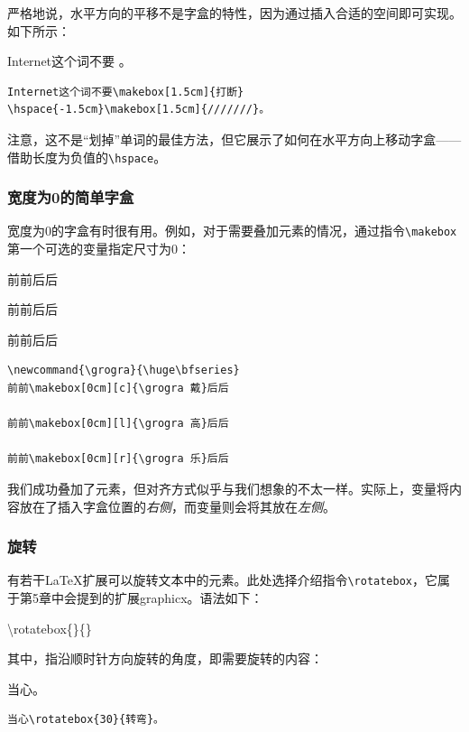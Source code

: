严格地说，水平方向的平移不是字盒的特性，因为通过插入合适的空间即可实现。如下所示：

\begin{codelist}[4.13]{
  Internet这个词不要
\hspace{-1.5cm}\makebox[1.5cm]{///////}。
}\begin{verbatim}
Internet这个词不要\makebox[1.5cm]{打断}
\hspace{-1.5cm}\makebox[1.5cm]{///////}。
\end{verbatim}
\end{codelist}

注意，这不是“划掉”单词的最佳方法，但它展示了如何在水平方向上移动字盒——借助长度为负值的\verb|\hspace|。

\subsubsection{宽度为0的简单字盒}

宽度为0的字盒有时很有用。例如，对于需要叠加元素的情况，通过指令\verb|\makebox|第一个可选的变量指定尺寸为0：

\begin{codelist}[4.14]{
  \newcommand{\grogra}{\huge\bfseries}
前前\makebox[0cm][c]{\grogra 戴}后后

前前\makebox[0cm][l]{\grogra 高}后后

前前\makebox[0cm][r]{\grogra 乐}后后
}\begin{verbatim}
\newcommand{\grogra}{\huge\bfseries}
前前\makebox[0cm][c]{\grogra 戴}后后

前前\makebox[0cm][l]{\grogra 高}后后

前前\makebox[0cm][r]{\grogra 乐}后后
\end{verbatim}
\end{codelist}

我们成功叠加了元素，但对齐方式似乎与我们想象的不太一样。实际上，变量将内容放在了插入字盒位置的\emph{右侧}，而变量则会将其放在\emph{左侧}。

\subsubsection{旋转}

有若干\LaTeX 扩展可以旋转文本中的元素。此处选择介绍指令\verb|\rotatebox|，它属于第5章中会提到的扩展\textsf{graphicx}。语法如下：

\begin{dmd}
\backslash rotatebox\{\}\{\}
\end{dmd}

其中，指沿顺时针方向旋转的角度，即需要旋转的内容：

\begin{codelist}[4.15]{
  当心。
}\begin{verbatim}
当心\rotatebox{30}{转弯}。
\end{verbatim}
\end{codelist}